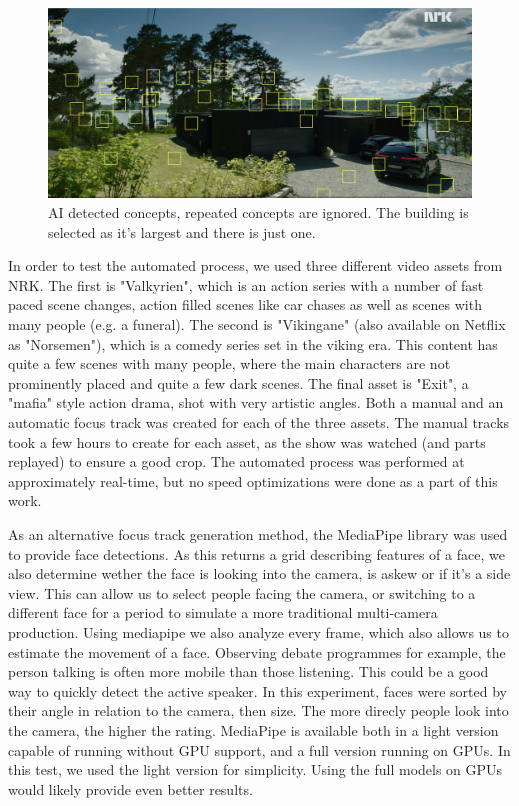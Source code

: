 \documentclass[sigconf, review=true]{acmart}
\begin{document}
\begin{figure}
\begin{center}
\includegraphics[width=1.0\columnwidth]{track_stuff.png}
\caption{AI detected concepts, repeated concepts are ignored. The building is
 selected as it's largest and there is just one.}
\label{fig_stuff_tracking}
\end{center}
\end{figure}

In order to test the automated process, we used three different video assets
from NRK. The first is "Valkyrien", which is an action series with a number
of fast paced scene changes, action filled scenes like car chases as well as
scenes with many people (e.g. a funeral). The second is "Vikingane"
(also available on Netflix as "Norsemen"), which is a comedy series set in
the viking era. This content has quite a few scenes with many people, where
the main characters are not prominently placed and quite a few dark scenes.
The final asset is "Exit", a "mafia" style action drama, shot with very
artistic angles. Both a manual and an automatic focus track was created for
each of the three assets. The manual tracks took a few hours to create for
each asset, as the show was watched (and parts replayed) to ensure a good
crop. The automated process was performed at approximately real-time, but no
speed optimizations were done as a part of this work.

As an alternative focus track generation method, the MediaPipe library\cite
{mediapipe} was used to provide face detections. As this returns a grid
describing features of a face, we also determine wether the face is looking
into the camera, is askew or if it's a side view. This can allow us to select
people facing the camera, or switching to a different face for a period to
simulate a more traditional multi-camera production. Using mediapipe we also
analyze every frame, which also allows us to estimate the movement of a face.
Observing debate programmes for example, the person talking is often more
mobile than those listening. This could be a good way to quickly detect the
active speaker. In this experiment, faces were sorted by their angle in
relation to the camera, then size. The more direcly people look into the
camera, the higher the rating. MediaPipe is available both in a light version
capable of running without GPU support, and a full version running on GPUs.
In this test, we used the light version for simplicity. Using the full models
on GPUs would likely provide even better results.
\end{document}
